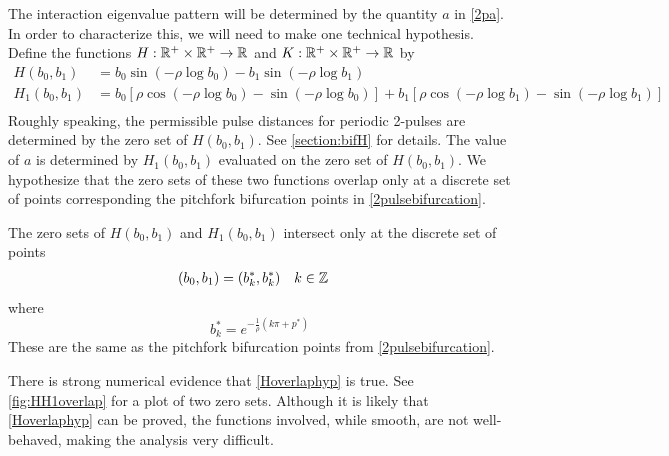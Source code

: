 \documentclass[thesis.tex]{subfiles}
\begin{document}
The interaction eigenvalue pattern will be determined by the quantity $a$ in \cref{2pa}. In order to characterize this, we will need to make one technical hypothesis. Define the functions $H: \mathbb{R}^+ \times \mathbb{R}^+ \rightarrow \mathbb{R}$ and $K: \mathbb{R}^+ \times \mathbb{R}^+ \rightarrow \mathbb{R}$ by 
\begin{align}
H(b_0, b_1) &= b_0 \sin \left( -\rho \log b_0 \right) - b_1 \sin \left( -\rho \log b_1 \right) \label{perdefH} \\
H_1(b_0, b_1) &= b_0 \left[ \rho \cos \left( -\rho \log b_0 \right) - \sin \left( -\rho \log b_0 \right) \right] + b_1 \left[ \rho \cos \left( -\rho \log b_1 \right) - \sin \left( -\rho \log b_1 \right) \right]  \label{perdefH1} \\
\end{align}
Roughly speaking, the permissible pulse distances for periodic 2-pulses are determined by the zero set of $H(b_0, b_1)$. See \cref{section:bifH} for details. The value of $a$ is determined by $H_1(b_0, b_1)$ evaluated on the zero set of $H(b_0, b_1)$. We hypothesize that the zero sets of these two functions overlap only at a discrete set of points corresponding the pitchfork bifurcation points in \cref{2pulsebifurcation}.

\begin{hypothesis}\label{Hoverlaphyp}
The zero sets of $H(b_0, b_1)$ and $H_1(b_0, b_1)$ intersect only at the discrete set of points
\begin{align*}
(b_0, b_1) &= (b_k^*, b_k^*) && k \in \mathbb{Z}
\end{align*}
where 
\begin{equation*}
b^*_k = e^{-\frac{1}{\rho} (k \pi + p^*) }
\end{equation*}
These are the same as the pitchfork bifurcation points from \cref{2pulsebifurcation}.
\end{hypothesis}

\begin{remark}There is strong numerical evidence that \cref{Hoverlaphyp} is true. See \cref{fig:HH1overlap} for a plot of two zero sets. Although it is likely that \cref{Hoverlaphyp} can be proved, the functions involved, while smooth, are not well-behaved, making the analysis very difficult.
\end{remark}
\end{document}
